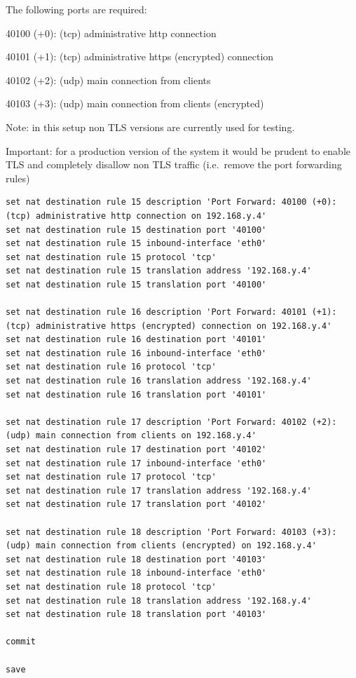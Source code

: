 The following ports are required:

40100 (+0): (tcp) administrative http connection

40101 (+1): (tcp) administrative https (encrypted) connection

40102 (+2): (udp) main connection from clients

40103 (+3): (udp) main connection from clients (encrypted)

Note: in this setup non TLS versions are currently used for testing.

Important: for a production version of the system it would be prudent to
enable TLS and completely disallow non TLS traffic (i.e.~remove the port
forwarding rules)

\begin{verbatim}
set nat destination rule 15 description 'Port Forward: 40100 (+0): (tcp) administrative http connection on 192.168.y.4'
set nat destination rule 15 destination port '40100'
set nat destination rule 15 inbound-interface 'eth0'
set nat destination rule 15 protocol 'tcp'
set nat destination rule 15 translation address '192.168.y.4'
set nat destination rule 15 translation port '40100'

set nat destination rule 16 description 'Port Forward: 40101 (+1): (tcp) administrative https (encrypted) connection on 192.168.y.4'
set nat destination rule 16 destination port '40101'
set nat destination rule 16 inbound-interface 'eth0'
set nat destination rule 16 protocol 'tcp'
set nat destination rule 16 translation address '192.168.y.4'
set nat destination rule 16 translation port '40101'

set nat destination rule 17 description 'Port Forward: 40102 (+2): (udp) main connection from clients on 192.168.y.4'
set nat destination rule 17 destination port '40102'
set nat destination rule 17 inbound-interface 'eth0'
set nat destination rule 17 protocol 'tcp'
set nat destination rule 17 translation address '192.168.y.4'
set nat destination rule 17 translation port '40102'

set nat destination rule 18 description 'Port Forward: 40103 (+3): (udp) main connection from clients (encrypted) on 192.168.y.4'
set nat destination rule 18 destination port '40103'
set nat destination rule 18 inbound-interface 'eth0'
set nat destination rule 18 protocol 'tcp'
set nat destination rule 18 translation address '192.168.y.4'
set nat destination rule 18 translation port '40103'

commit

save
\end{verbatim}

